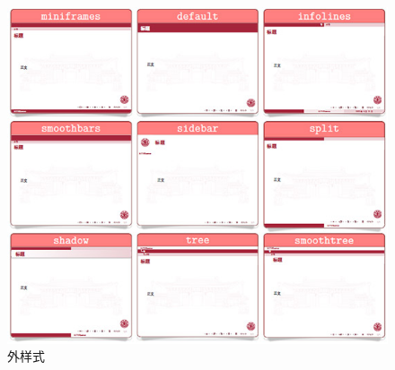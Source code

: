 \begin{frame}[fragile]
\begin{columns}
\begin{column}{0.4\textwidth}
{\begin{figure}
          \includegraphics[width=\linewidth]{support/images/sjtubeamerouter.jpg}
          \caption{外样式}
        \end{figure}
      }
    \end{column}
  \end{columns}
\end{frame}


